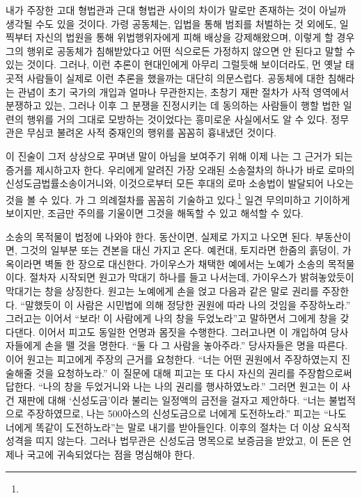 내가 주장한 고대 형법관과 근대 형법관 사이의 차이가
말로만 존재하는 것이 아닐까 생각될 수도 있을 것이다.
가령 공동체는,
입법을 통해 범죄를 처벌하는 것 외에도,
일찍부터
자신의 법원을 통해
위법행위자에게 피해 배상을
강제해왔으며,
이렇게 할 경우
그의 행위로 공동체가 침해받았다고
어떤 식으로든
가정하지 않으면 안 된다고
말할 수 있는 것이다.
그러나,
이런 추론이
현대인에게
아무리 그럴듯해 보이더라도,
먼 옛날 태곳적 사람들이
실제로
이런 추론을
했을까는 대단히 의문스럽다.
공동체에 대한 침해라는 관념이
초기 국가의 개입과
얼마나 무관한지는,
초창기 재판 절차가
사적 영역에서 분쟁하고 있는,
그러나 이후 그 분쟁을 진정시키는 데 동의하는
사람들이 행할 법한
일련의 행위를 거의 그대로 모방하는 것이었다는
흥미로운 사실에서도
알 수 있다.
정무관은 무심코 불려온 사적 중재인의 행위를 꼼꼼히 흉내냈던 것이다.

이 진술이 그저 상상으로 꾸며낸 말이 아님을 보여주기 위해
이제 나는 그 근거가 되는 증거를 제시하고자 한다.
우리에게 알려진 가장 오래된 소송절차의 하나가
바로 로마의
신성도금법률소송이거니와,
이것으로부터 모든 후대의 로마 소송법이 발달되어 나오는 것을 볼 수 있다.
가 그 의례절차를 꼼꼼히 기술하고 있다.\footnote{%
   }
일견 무의미하고 기이하게 보이지만,
조금만 주의를 기울이면 그것을 해독할 수 있고 해석할 수 있다.

소송의 목적물이 법정에 나와야 한다.
동산이면, 실제로 가지고 나오면 된다.
부동산이면, 그것의 일부분 또는 견본을 대신 가지고 온다.
예컨대, 토지라면 한줌의 흙덩이, 가옥이라면 벽돌 한 장으로 대신한다.
가이우스가 채택한 예에서는 노예가 소송의 목적물이다.
절차자 시작되면 원고가 막대기 하나를 들고 나서는데,
가이우스가 밝혀놓았듯이 막대기는 창을 상징한다.
원고는 노예에게 손을 얹고 다음과 같은 말로 권리를 주장한다.
``말했듯이
이 사람은 시민법에 의해 정당한 권원에 따라 나의 것임을
주장하노라.''
그러고는 이어서 ``보라! 이 사람에게 나의 창을
두었노라''고 말하면서
그에게 창을 갖다댄다.
이어서 피고도 동일한 언명과 몸짓을 수행한다.
그러고나면 이 개입하여
당사자들에게 손을 뗄 것을 명한다.
``둘 다 그 사람을 놓아주라.''
당사자들은 명을 따른다.
이어 원고는 피고에게 주장의 근거를 요청한다.
``너는 어떤 권원에서 주장하였는지 진술해줄 것을
요청하노라.''
이 질문에 대해 피고는 또 다시 자신의 권리를 주장함으로써 답한다.
``나의 창을 두었거니와 나는 나의 권리를 행사하였노라.''
그러면 원고는 이 사건 재판에 대해
`신성도금'이라 불리는 일정액의 금전을 걸자고 제안하다.
``너는 불법적으로 주장하였므로,
나는 500아스의 신성도금으로 너에게
도전하노라.''
피고는 ``나도 너에게 똑같이 도전하노라''는 말로
내기를 받아들인다.
이후의 절차는 더 이상 요식적 성격을 띠지 않는다.
그러나 법무관은 신성도금 명목으로 보증금을 받았고,
이 돈은 언제나 국고에 귀속되었다는 점을 명심해야 한다.

